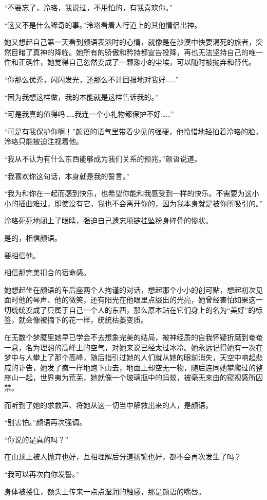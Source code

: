 \documentclass[UTF8, scheme = chinese, openany]{ctexbook}
\begin{document}
“不要忘了，泠珞，我说过，不用怕的，有我喜欢你。”

“这又不是什么稀奇的事。”泠珞看着人行道上的其他情侣出神。

她又想起自己第一天看到颜语表演时的心情，就像是在沙漠中快要渴死的旅者，突然目睹了真神的降临。她所有的骄傲和矜持都宣告投降，再也无法坚持自己的唯一性和正确性，她觉得自己忽然变成了一颗渺小的尘埃，可以随时被抛弃和替代。

“你那么优秀，闪闪发光，还那么不计回报地对我好……”

“因为我想这样做，我的本能就是这样告诉我的。”

“可是我真的值得吗……我连一个小礼物都保护不好……”

“可是有我保护你啊！”颜语的语气里带着少见的强硬，他怜惜地轻拍着泠珞的脸，泠珞只能被迫注视着他。

“我从不认为有什么东西能够成为我们关系的预兆。”颜语说道。

“我喜欢你这句话，本身就是我的誓言。”

“我为和你在一起而感到快乐，也希望你能和我感受到一样的快乐。不需要为这小小的插曲难过，即使没有它，我也不会离开你的，因为我本身就是被你所吸引的。”

泠珞死死地闭上了眼睛，强迫自己遗忘项链挂坠粉身碎骨的惨状。

是的，相信颜语。

要相信他。

相信那完美扣合的宿命感。

她想起坐在颜语的车后座两个人拘谨的对话，想起那个小小的创可贴，想起初次见面时他的琴声、他的微笑，还有阳光在他眼里点缀出的光亮，她曾经害怕如果这一切统统变成了只属于自己一个人的东西，那么原本贴在它们身上的名为“美好”的标签，就会像被摘下的花一样，统统枯萎变质。

在无数个梦魇里她早已学会不去想象完美的结局，被神经质的自我怀疑折磨到奄奄一息，名为理想的高峰上的空气，对她来说已经太过冰冷。她永远记得她有一次在梦中与人攀上了那个高峰，随后指引过她的人们就从她的眼前消失，天空中响起悲戚的讣告，她发了疯一样地跑下山去，地面上却空无一物，随后连同她攀爬过的整座山一起，世界夷为荒芜，她就像一个玻璃瓶中的蚂蚁，被毫无来由的窥视感所囚禁。

而听到了她的求救声、将她从这一切当中解救出来的人，是颜语。

“别害怕。”颜语再次强调。

“你说的是真的吗？”

在山顶上被人抛弃也好，互相理解后分道扬镳也好，都不会再次发生了吗？

“我可以再次向你发誓。”

身体被搂住，额头上传来一点点湿润的触感，那是颜语的嘴唇。
\end{document}
